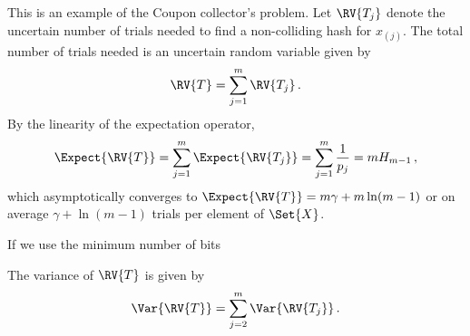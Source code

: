 \documentclass[ ../main.tex]{subfiles}
\begin{document}
This is an example of the Coupon collector's problem.
Let $\RV{T_j}$ denote the uncertain number of trials needed to find a non-colliding hash for $x_{(j)}$.
The total number of trials needed is an uncertain random variable given by
\begin{equation}
\RV{T} = \sum_{j=1}^{m} \RV{T_j}\,.
\end{equation}
By the linearity of the expectation operator,
\begin{equation}
\Expect{\RV{T}} = \sum_{j=1}^{m} \Expect{\RV{T_j}} = \sum_{j=1}^{m} \frac{1}{p_j} = m H_{m-1}\,,
\end{equation}
which asymptotically converges to $\Expect{\RV{T}} = m \gamma + m \ln(m-1)$ or on average $\gamma + \ln (m-1)$ trials per element of $\Set{X}$.

If we use the minimum number of bits

The variance of $\RV{T}$ is given by
\begin{equation}
\Var{\RV{T}} = \sum_{j=2}^{m }\Var{\RV{T_j}}\,.
\end{equation}
\end{document}
